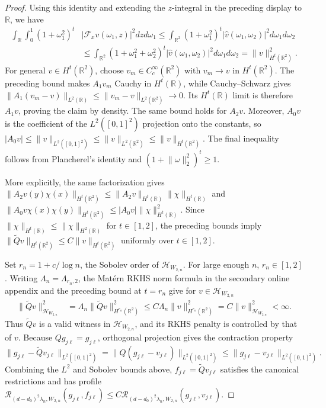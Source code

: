 \documentclass[letterpaper,12pt]{article}
\theoremstyle{definition}
\numberwithin{equation}{section}
\newcommand{\mr}{\mathbb{R}}
\newcommand{\mc}{\mathcal}
\newcommand{\norm}[1]{\lVert#1\rVert}
\begin{document}
\begin{proof}
Using this identity and extending the $z$-integral in the preceding display to $\mr$, we have
\begin{align*}
\int_{\mr}\int_0^1(1+\omega_1^2)^t &|\mathcal F_xv(\omega_1,z)|^2dzd\omega_1 \leq\int_{\mr^2}(1+\omega_1^2)^t|\widehat v(\omega_1,\omega_2)|^2d\omega_1d\omega_2\\
&\leq\int_{\mr^2}(1+\omega_1^2+\omega_2^2)^t|\widehat v(\omega_1,\omega_2)|^2d\omega_1d\omega_2=\norm{v}_{H^t(\mr^2)}^2.
\end{align*}
For general $v\in H^t(\mr^2)$, choose $v_m\in C_c^\infty(\mr^2)$ with $v_m\to v$ in $H^t(\mr^2)$.
The preceding bound makes $A_1v_m$ Cauchy in $H^t(\mr)$, while Cauchy--Schwarz gives $\norm{A_1(v_m-v)}_{L^2(\mr)}\leq\norm{v_m-v}_{L^2(\mr^2)}\to0$.
Its $H^t(\mr)$ limit is therefore $A_1v$, proving the claim by density.
The same bound holds for $A_2v$.
Moreover, $A_0v$ is the coefficient of the $L^2([0,1]^2)$ projection onto the constants, so $|A_0v|\leq\norm{v}_{L^2([0,1]^2)}\leq\norm{v}_{L^2(\mr^2)}\leq\norm{v}_{H^t(\mr^2)}$.
The final inequality follows from Plancherel's identity and $(1+\norm{\omega}_2^2)^t\geq1$.

More explicitly, the same factorization gives $\norm{A_2v(y)\chi(x)}_{H^t(\mr^2)}\leq\norm{A_2v}_{H^t(\mr)}\norm{\chi}_{H^t(\mr)}$ and $\norm{A_0v\chi(x)\chi(y)}_{H^t(\mr^2)}\leq|A_0v|\norm{\chi}_{H^t(\mr)}^2$.
Since $\norm{\chi}_{H^t(\mr)}\leq\norm{\chi}_{H^2(\mr)}$ for $t\in[1,2]$, the preceding bounds imply $\norm{\widetilde Qv}_{H^t(\mr^2)}\leq C\norm{v}_{H^t(\mr^2)}$ uniformly over $t\in[1,2]$.

Set $r_n=1+c/\log n$, the Sobolev order of $\mc H_{W_{2,n}}$.
For large enough $n$, $r_n\in[1,2]$.
Writing $\Lambda_n=\Lambda_{r_n,2}$, the Mat\'ern RKHS norm formula in the secondary online appendix and the preceding bound at $t=r_n$ give for $v\in\mc H_{W_{2,n}}$
\begin{align}
\norm{\widetilde Qv}_{\mc H_{W_{2,n}}}^2&=\Lambda_n\norm{\widetilde Qv}_{H^{r_n}(\mr^2)}^2 \leq C\Lambda_n\norm{v}_{H^{r_n}(\mr^2)}^2=C\norm{v}_{\mc H_{W_{2,n}}}^2<\infty.\label{equation:proof-whole-space-anova-bound}
\end{align}
Thus $\widetilde Qv$ is a valid witness in $\mc H_{W_{2,n}}$, and its RKHS penalty is controlled by that of $v$.
Because $Qg_{j\ell}=g_{j\ell}$, orthogonal projection gives the contraction property
\begin{equation*}
\norm{g_{j\ell}-\widetilde Qv_{j\ell}}_{L^2([0,1]^2)}=\norm{Q(g_{j\ell}-v_{j\ell})}_{L^2([0,1]^2)}\leq\norm{g_{j\ell}-v_{j\ell}}_{L^2([0,1]^2)}.
\end{equation*}
Combining the $L^2$ and Sobolev bounds above, $f_{j\ell}=\widetilde Qv_{j\ell}$ satisfies the canonical restrictions and has profile $\mathcal R_{(d-d_0)^2\lambda_n,W_{2,n}}(g_{j\ell},f_{j\ell})\leq C\mathcal R_{(d-d_0)^2\lambda_n,W_{2,n}}(g_{j\ell},v_{j\ell})$.


\end{proof}
\end{document}
